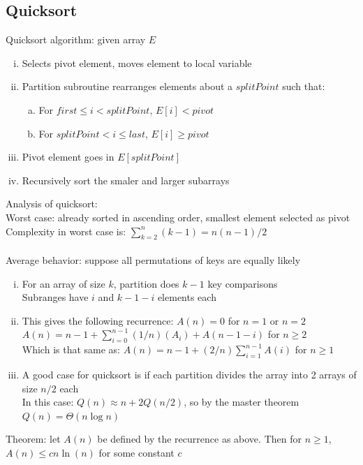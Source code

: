 \documentclass{article}
\begin{document}
		\subsection{Quicksort}
			Quicksort algorithm: given array $E$
			\begin{enumerate}[(i)]
				\item Selects pivot element, moves element to local variable
				\item Partition subroutine rearranges elements about a $splitPoint$ such that:
				\begin{enumerate}[(a)]
					\item For $first \leq i < splitPoint$, $E[i] < pivot$
					\item For $splitPoint < i \leq last$, $E[i] \geq pivot$
					\end{enumerate}
				\item Pivot element goes in $E[splitPoint]$
				\item Recursively sort the smaler and larger subarrays
				\end{enumerate}
			Analysis of quicksort: \\
			Worst case: already sorted in ascending order, smallest element selected as pivot \\
			Complexity in worst case is: $\sum_{k = 2}^n(k - 1) = n(n - 1)/2$ \\
			\\
			Average behavior: suppose all permutations of keys are equally likely
			\begin{enumerate}[(i)]
				\item For an array of size $k$, partition does $k - 1$ key comparisons \\
				Subranges have $i$ and $k - 1 - i$ elements each
				\item This gives the following recurrence: $A(n) = 0$ for $n = 1$ or $n = 2$ \\
				$A(n) = n - 1 + \sum_{i = 0}^{n - 1} (1/n)(A_i) + A(n - 1 - i)$ for $n \geq 2$ \\
				Which is that same as: $A(n) = n - 1 + (2/n)\sum_{i = 1}^{n - 1} A(i)$ for $n \geq 1$
				\item A good case for quicksort is if each partition divides the array into 2 arrays of size $n/2$ each \\
				In this case: $Q(n) \approx n + 2Q(n/2)$, so by the master theorem $Q(n) = \Theta(n \log{n})$
				\end{enumerate}
			Theorem: let $A(n)$ be defined by the recurrence as above. Then for $n \geq 1$, $A(n) \leq cn\ln(n)$ for some constant $c$ \\
\end{document}
